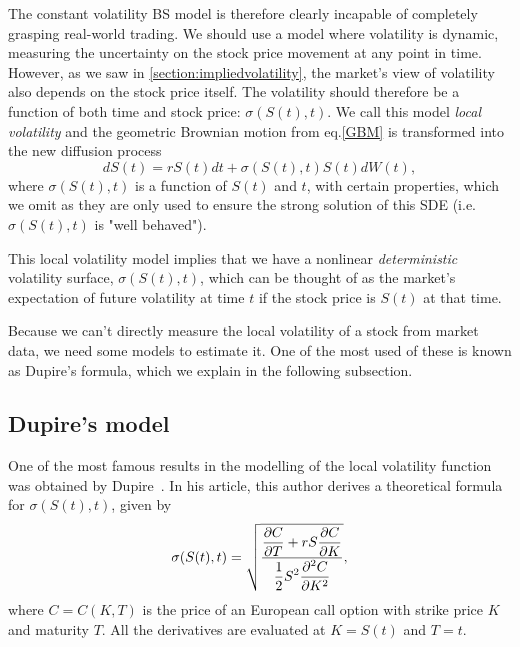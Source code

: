 The constant volatility BS model is therefore clearly incapable of completely grasping real-world trading. We should use a model where volatility is dynamic, measuring the uncertainty on the stock price movement at any point in time.
However, as we saw in \autoref{section:impliedvolatility}, the market's view of volatility also depends on the stock price itself.
The volatility should therefore be a function of both time and stock price: $\sigma(S(t),t)$. We call this model \emph{local volatility} and the geometric Brownian motion from eq.\eqref{GBM} is transformed into the new diffusion process
\begin{equation}\label{GBM2}
dS(t)=rS(t)dt+\sigma(S(t),t)S(t)dW(t),
\end{equation}
\noindent where $\sigma(S(t),t)$ is a function of $S(t)$ and $t$, with certain properties, which we omit as they are only used to ensure the strong solution of this SDE (i.e. $\sigma(S(t),t)$ is "well behaved").


This local volatility model implies that we have a nonlinear \emph{deterministic} volatility surface, $\sigma(S(t),t)$, which can be thought of as the market's expectation of future volatility at time $t$ if the stock price is $S(t)$ at that time.



Because we can't directly measure the local volatility of a stock from market data, we need some models to estimate it. One of the most used of these is known as Dupire's formula, which we explain in the following subsection.


\subsection{Dupire's model}
\label{subsection:Dupire}
One of the most famous results in the modelling of the local volatility function was obtained by Dupire~\citep{Dupire}. In his article, this author derives a theoretical formula for $\sigma(S(t),t)$, given by
\begin{equation}\label{dupire}
\sigma(S(t),t)=\sqrt{\frac{\displaystyle\pdv{C}{T}+rS\pdv{C}{K}}{\displaystyle\frac{1}{2}S^2\pdv{^2C}{K^2}}},
\end{equation}
\noindent where $C=C(K,T)$ is the price of an European call option with strike price $K$ and maturity $T$. All the derivatives are evaluated at $K=S(t)$ and $T=t$.



